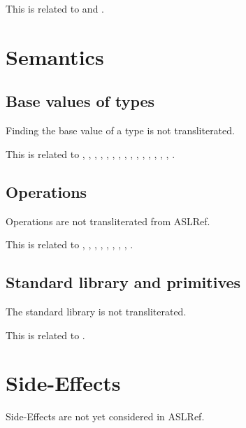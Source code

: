 \documentclass{book}
\begin{document}
This is related to  and .

\section{Semantics}

\subsection{Base values of types}

Finding the base value of a type is not transliterated.

This is related to , , , ,
, , , , ,
, , , , ,
, .

\subsection{Operations}

Operations are not transliterated from ASLRef.

This is related to , , , ,
, , , , .

\subsection{Standard library and primitives}

The standard library is not transliterated.

This is related to .

\section{Side-Effects}

Side-Effects are not yet considered in ASLRef.
\end{document}
